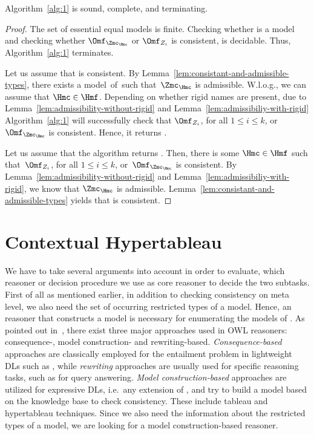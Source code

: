\begin{lemma}\label{lem:alg1-sound-complete-terminating}
  Algorithm~\ref{alg:1} is sound, complete, and terminating.
\end{lemma}
\begin{proof}
  The set of essential equal models is finite. Checking whether \Hmc is a model and checking whether
  $\Omf_{\Zmc_{\Hmc}}$ or $\Omf_{Z_{i}}$ is consistent, is decidable. Thus, Algorithm~\ref{alg:1}
  terminates.

  Let us assume that \Bmf is consistent. By Lemma~\ref{lem:consistant-and-admissible-types}, there
  exists a model~\Hmc of~\Bmfb such that~$\Zmc_{\Hmc}$ is admissible. W.l.o.g., we can assume that
  $\Hmc\in\Hmf$. 
  Depending on whether rigid names are present, due to
  Lemma~\ref{lem:admissibility-without-rigid} and Lemma~\ref{lem:admissibiliy-with-rigid} Algorithm~\ref{alg:1} will successfully check that
  $\Omf_{Z_{i}}$, for all $1\leq i \leq k$, or $\Omf_{\Zmc_{\Hmc}}$ is consistent. Hence, it
  returns \true.

  Let us assume that the algorithm returns \true. Then, there is some $\Hmc\in\Hmf$ such that~$\Omf_{Z_{i}}$,
  for all $1\leq i \leq k$, or~$\Omf_{\Zmc_{\Hmc}}$ is consistent. By
  Lemma~\ref{lem:admissibility-without-rigid} and Lemma~\ref{lem:admissibiliy-with-rigid}, we know
  that $\Zmc_{\Hmc}$ is admissible. Lemma~\ref{lem:consistant-and-admissible-types} yields that \Bmf
  is consistent.
\end{proof}



\section{Contextual Hypertableau}
\label{sec:using-hypertableau}

We have to take several arguments into account in order to evaluate, which reasoner or decision
procedure we use as core reasoner to decide the two subtasks.
%
First of all as mentioned earlier, in addition to checking consistency on meta level, we also need
the set of occurring restricted types of a model. Hence, an reasoner that constructs a model is
necessary for enumerating the models of \Bmfb. As pointed out in~\cite{MaLHSP-ORE15}, there exist
three major approaches used in OWL reasoners: consequence-, model construction- and
rewriting-based. \emph{Consequence-based} approaches are classically employed for the entailment
problem in lightweight DLs such as \EL, while \emph{rewriting} approaches are usually used for
specific reasoning tasks, such as for query answering. \emph{Model construction-based} approaches
are utilized for expressive DLs, i.e.\ any extension of \ALC, and try to build a model based on the
knowledge base to check consistency. These include tableau and hypertableau techniques. Since we
also need the information about the restricted types of a model, we are looking for a model
construction-based reasoner.

